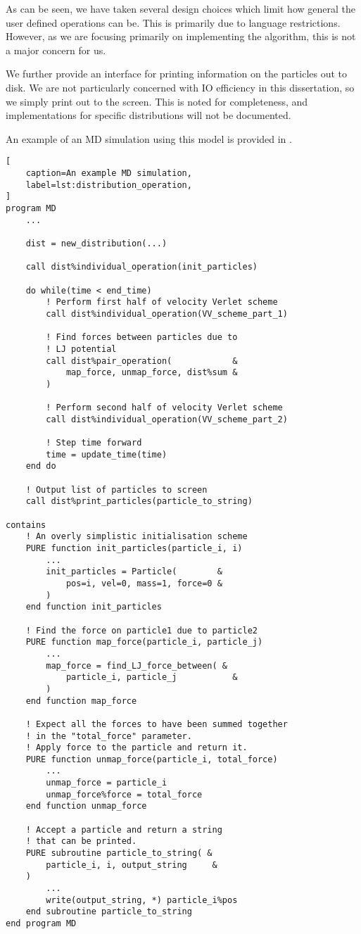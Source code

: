 As can be seen, we have taken several design choices which limit how
general the user defined operations can be.
%
This is primarily due to language restrictions.
%
However, as we are focusing primarily on implementing
the \velocityverlet{} algorithm, this is not a major concern for us.

We further provide an interface for printing information on the particles
out to disk.
%
We are not particularly concerned with IO efficiency in this dissertation,
so we simply print out to the screen.
%
This is noted for completeness, and implementations for specific distributions
will not be documented.

An example of an MD simulation using this model is provided in
.

\begin{lstlisting}[
    caption=An example MD simulation,
    label=lst:distribution_operation,
]
program MD
    ...

    dist = new_distribution(...)

    call dist%individual_operation(init_particles)

    do while(time < end_time)
        ! Perform first half of velocity Verlet scheme
        call dist%individual_operation(VV_scheme_part_1)

        ! Find forces between particles due to
        ! LJ potential
        call dist%pair_operation(            &
            map_force, unmap_force, dist%sum &
        )

        ! Perform second half of velocity Verlet scheme
        call dist%individual_operation(VV_scheme_part_2)

        ! Step time forward
        time = update_time(time)
    end do

    ! Output list of particles to screen
    call dist%print_particles(particle_to_string)

contains
    ! An overly simplistic initialisation scheme
    PURE function init_particles(particle_i, i)
        ...
        init_particles = Particle(        &
            pos=i, vel=0, mass=1, force=0 &
        )
    end function init_particles

    ! Find the force on particle1 due to particle2
    PURE function map_force(particle_i, particle_j)
        ...
        map_force = find_LJ_force_between( &
            particle_i, particle_j           &
        )
    end function map_force

    ! Expect all the forces to have been summed together
    ! in the "total_force" parameter.
    ! Apply force to the particle and return it.
    PURE function unmap_force(particle_i, total_force)
        ...
        unmap_force = particle_i
        unmap_force%force = total_force
    end function unmap_force

    ! Accept a particle and return a string
    ! that can be printed.
    PURE subroutine particle_to_string( &
        particle_i, i, output_string     &
    )
        ...
        write(output_string, *) particle_i%pos
    end subroutine particle_to_string
end program MD
\end{lstlisting}



